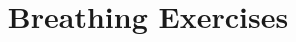 
\graphicspath{{images/}} %


\title{Breathing Exercises} %



\begin{frame}
\titlepage %
\end{frame}









 